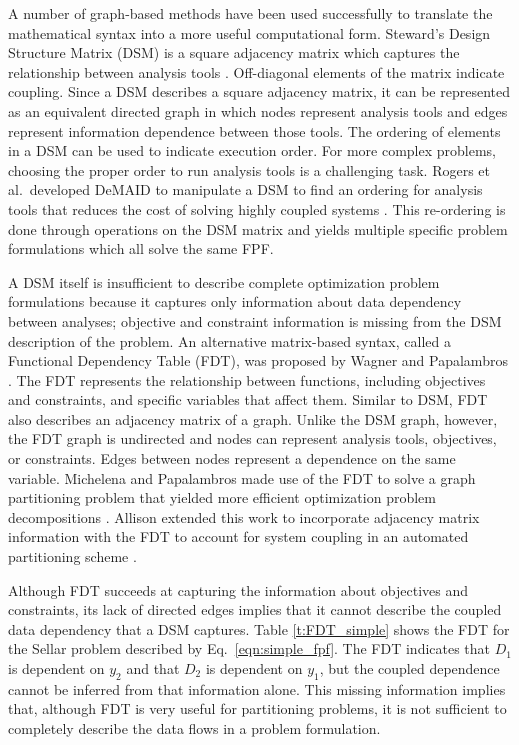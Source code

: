     A number of graph-based methods have been used successfully to translate the 
    mathematical syntax into a more useful computational form. 
    Steward's Design Structure Matrix (DSM) is a square adjacency matrix which captures the relationship between analysis tools \cite{Steward1981}.
    Off-diagonal elements of the matrix indicate coupling. Since a DSM describes a square adjacency matrix, 
    it can be represented as an equivalent directed graph in which nodes represent analysis tools and 
    edges represent information dependence between those tools. The ordering of elements in a DSM can be used to indicate 
    execution order.  For more complex problems, choosing the proper order to run analysis tools is a challenging task. 
    Rogers et al.~developed DeMAID to manipulate a DSM to find an ordering for analysis tools that 
    reduces the cost of solving highly coupled systems \cite{rogers1996,rogers1996demaid}. This re-ordering is done through 
    operations on the DSM matrix and yields multiple specific problem 
    formulations which all solve the same FPF. 
    
    A DSM itself is insufficient to describe complete optimization problem formulations because it 
    captures only information about data dependency between analyses; objective and 
    constraint information is missing from the DSM description of the problem. 
    An alternative matrix-based syntax, called a Functional Dependency Table (FDT), was proposed by Wagner and Papalambros \cite{Wagner1993}. 
    The FDT represents the relationship between functions, including objectives and constraints, and specific variables that affect 
    them. Similar to DSM, FDT also describes an adjacency matrix of a graph. Unlike the DSM graph, 
    however, the FDT graph is undirected and nodes can represent analysis tools, objectives, 
    or constraints. Edges between nodes represent a dependence on the same 
    variable. Michelena and Papalambros made use of the FDT to solve a graph partitioning problem that yielded 
    more efficient optimization problem decompositions \cite{Michelena1997}. Allison 
    extended this work to incorporate adjacency matrix information with the FDT to 
    account for system coupling in an automated partitioning scheme \cite{Allison2008}. 

    Although FDT succeeds at capturing the 
    information about objectives and constraints, its lack of directed edges 
    implies that it cannot describe the coupled data dependency that a DSM captures. 
    Table \ref{t:FDT_simple}  shows the FDT for the Sellar problem described by Eq.~\ref{eqn:simple_fpf}.
    The FDT indicates that $D_1$ is dependent on $y_2$ and 
    that $D_2$ is dependent on $y_1$, but the coupled dependence cannot be inferred from 
    that information alone. This missing information implies 
    that, although FDT is very useful for partitioning problems, it is not 
    sufficient to completely describe the data flows in a problem formulation. 

